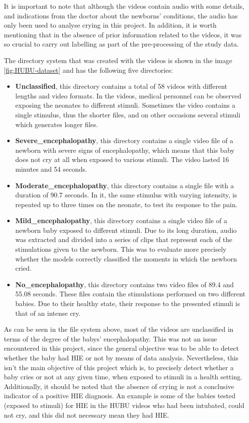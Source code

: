 \begin{tcolorbox}
It is important to note that although the videos contain audio with some details, and indications from the doctor about the newborns’ conditions, the audio has only been used to analyse crying in this project. In addition, it is worth mentioning that in the absence of prior information related to the videos, it was so crucial to carry out labelling as part of the pre-processing of the study data.
\end{tcolorbox}

The directory system that was created with the videos is shown in the image \ref{fig:HUBU-dataset} and has the following five directories:
\begin{itemize}
    \item \textbf{Unclassified}, this directory contains a total of 58 videos with different lengths and video formats. In the videos, medical personnel can be observed exposing the neonates to different stimuli.  Sometimes the video contains a single stimulus, thus the shorter files, and on other occasions several stimuli which generates longer files.
    \item \textbf{Severe\_encephalopathy}, this directory contains a single video file of a newborn with severe signs of encephalopathy, which means that this baby does not cry at all when exposed to various stimuli. The video lasted 16 minutes and 54 seconds. 
    \item \textbf{Moderate\_encephalopathy}, this directory contains a single file with a duration of 90.7 seconds. In it, the same stimulus with varying intensity, is repeated up to three times on the neonate, to test its response to the pain.
    \item \textbf{Mild\_encephalopathy}, this directory contains a single video file of a newborn baby exposed to different stimuli. Due to its long duration, audio was extracted and divided into a series of clips that represent each of the stimulations given to the newborn. This was to evaluate more precisely whether the models correctly classified the moments in which the newborn cried.
    \item \textbf{No\_encephalopathy}, this directory contains two video files of 89.4 and 55.08 seconds. These files contain the stimulations performed on two different babies. Due to their healthy state, their response to the presented stimuli is that of an intense cry.
\end{itemize}

As can be seen in the file system above, most of the videos are unclassified in terms of the degree of the babys’ encephalopathy. This was not an issue encountered in this project, since the general objective was to be able to detect whether the baby had HIE or not by means of data analysis. Nevertheless, this isn’t the main objective of this project which is, to precisely detect whether a baby cries or not at any given time, when exposed to stimuli in a health setting. Additionally, it should be noted that the absence of crying is not a conclusive indicator of a positive HIE diagnosis. An example is some of the babies tested (exposed to stimuli) for HIE in the HUBU videos who had been intubated, could not cry, and this did not necessary mean they had HIE. 


